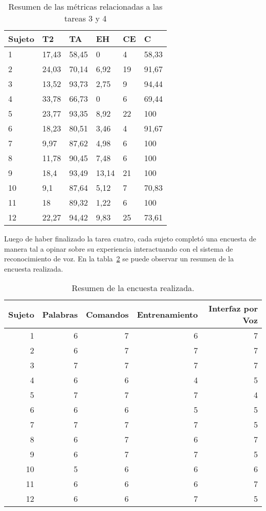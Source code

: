 \begin{table}[H]
\centering
\footnotesize
\begin{tabular}{|p{1.6cm}|p{1.6cm}|p{1.6cm}|p{1.6cm}|p{1.6cm}|p{1.6cm}|}
\hline
    Sujeto & T2 & TA   &  EH  & CE &  C\\
    \hline 
    1  & 17,43 & 58,45 & 0     & 4  & 58,33 \\
    2  & 24,03 & 70,14 & 6,92  & 19 & 91,67 \\
    3  & 13,52 & 93,73 & 2,75  & 9  & 94,44 \\
    4  & 33,78 & 66,73 & 0     & 6  & 69,44 \\
    5  & 23,77 & 93,35 & 8,92  & 22 & 100   \\
    6  & 18,23 & 80,51 & 3,46  & 4  & 91,67 \\
    7  & 9,97  & 87,62 & 4,98  & 6  & 100   \\
    8  & 11,78 & 90,45 & 7,48  & 6  & 100   \\
    9  & 18,4  & 93,49 & 13,14 & 21 & 100   \\
    10 & 9,1   & 87,64 & 5,12  & 7  & 70,83 \\
    11 & 18    & 89,32 & 1,22  & 6  & 100   \\
    12 & 22,27 & 94,42 & 9,83  & 25 & 73,61 \\
\hline
\end{tabular}
\caption{Resumen de las m\'etricas relacionadas a las tareas 3 y 4}
\label{sec:tabla-metricas-t4}
\end{table}


Luego de haber finalizado la tarea cuatro, cada sujeto complet\'o una encuesta de manera tal a
opinar sobre su experiencia interactuando con el sistema de reconocimiento de voz. En la tabla~\ref{sec:tabla-encuesta}
se puede observar un resumen de la encuesta realizada.


\begin{table}[H] 
\centering
\footnotesize
\begin{tabular}{|r|r|r|r|r|}
\hline
    Sujeto & Palabras & Comandos & Entrenamiento & Interfaz por Voz \\
    \hline
    1 & 6 & 7 & 6 & 7 \\
    2 & 6 & 7 & 7 & 7 \\
    3 & 7 & 7 & 7 & 7 \\
    4 & 6 & 6 & 4 & 5 \\
    5 & 7 & 7 & 7 & 4 \\
    6 & 6 & 6 & 5 & 5 \\
    7 & 7 & 7 & 7 & 5 \\
    8 & 6 & 7 & 6 & 7  \\
    9 & 6 & 7 & 7 & 5  \\
    10 & 5 & 6 & 6 & 6  \\
    11 & 6 & 6 & 6 & 7  \\
    12 & 6 & 6 & 7 & 5  \\
\hline
\end{tabular}
\caption{Resumen de la encuesta realizada.}
\label{sec:tabla-encuesta}
\end{table}

